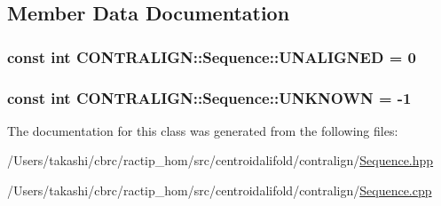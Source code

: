 \subsection{Member Data Documentation}
\hypertarget{class_c_o_n_t_r_a_l_i_g_n_1_1_sequence_a774a2f48e7469edbb81641e5abf26ccd}{
\subsubsection[{U\+N\+A\+L\+I\+G\+N\+E\+D}]{\setlength{\rightskip}{0pt plus 5cm}const int C\+O\+N\+T\+R\+A\+L\+I\+G\+N\+::\+Sequence\+::\+U\+N\+A\+L\+I\+G\+N\+E\+D = 0\hspace{0.3cm}{\ttfamily [static]}}}\label{class_c_o_n_t_r_a_l_i_g_n_1_1_sequence_a774a2f48e7469edbb81641e5abf26ccd}
\hypertarget{class_c_o_n_t_r_a_l_i_g_n_1_1_sequence_a6b77aa13d532d0e59d90e82a59100755}{
\subsubsection[{U\+N\+K\+N\+O\+W\+N}]{\setlength{\rightskip}{0pt plus 5cm}const int C\+O\+N\+T\+R\+A\+L\+I\+G\+N\+::\+Sequence\+::\+U\+N\+K\+N\+O\+W\+N = -\/1\hspace{0.3cm}{\ttfamily [static]}}}\label{class_c_o_n_t_r_a_l_i_g_n_1_1_sequence_a6b77aa13d532d0e59d90e82a59100755}


The documentation for this class was generated from the following files\+:\begin{DoxyCompactItemize}
\item 
/\+Users/takashi/cbrc/ractip\+\_\+hom/src/centroidalifold/contralign/\hyperlink{_sequence_8hpp}{Sequence.\+hpp}\item 
/\+Users/takashi/cbrc/ractip\+\_\+hom/src/centroidalifold/contralign/\hyperlink{_sequence_8cpp}{Sequence.\+cpp}\end{DoxyCompactItemize}
